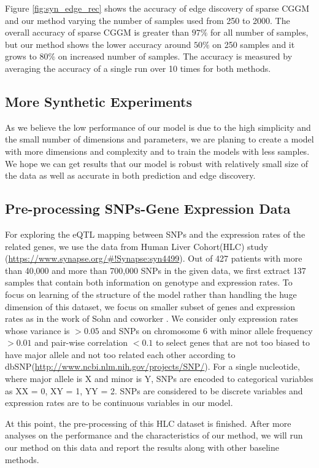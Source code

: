 \documentclass{article}
\begin{document}
Figure \ref{fig:syn_edge_rec} shows the accuracy of edge discovery of sparse CGGM and our method varying the number of samples used from 250 to 2000. The overall accuracy of sparse CGGM is greater than $97\%$ for all number of samples, but our method shows the lower accuracy  around $50\%$ on 250 samples and it grows to $80\%$ on increased number of samples. The accuracy is measured by averaging the accuracy of a single run over 10 times for both methods.

\subsection{More Synthetic Experiments}
As we believe the low performance of our model is due to the high simplicity and the small number of dimensions and parameters, we are planing to create a model with more dimensions and complexity and to train the models with less samples. We hope we can get results that our model is robust with relatively small size of the data as well as accurate in both prediction and edge discovery.

\subsection{Pre-processing SNPs-Gene Expression Data}
For exploring the eQTL mapping between SNPs and the expression rates of the related genes, we use the data from Human Liver Cohort(HLC) study \cite{schadt2008mapping} (\url{https://www.synapse.org/#!Synapse:syn4499}). Out of 427 patients with more than 40,000 and more than 700,000 SNPs in the given data, we first extract 137 samples that contain both information on genotype and expression rates. To  focus on learning of the structure of the model rather than handling the huge dimension of this dataset, we focus on smaller subset of genes and expression rates as in the work of Sohn and coworker \cite{sohn2012joint}. We consider only expression rates whose variance is $ > 0.05$ and SNPs on chromosome 6 with minor allele frequency $ > 0.01$ and pair-wise correlation $ < 0.1$ to select genes that are not too biased to have major allele and not too related each other according to dbSNP(\url{http://www.ncbi.nlm.nih.gov/projects/SNP/}). For a single nucleotide, where major allele is X and minor is Y, SNPs are encoded to categorical variables as XX = 0, XY = 1, YY = 2. SNPs are considered to be discrete variables and expression rates are to be continuous variables in our model.
 
At this point, the pre-processing of this HLC dataset is finished. After more analyses on the performance and the characteristics of our method, we will run our method on this data and report the results along with other baseline methods.
\end{document}
